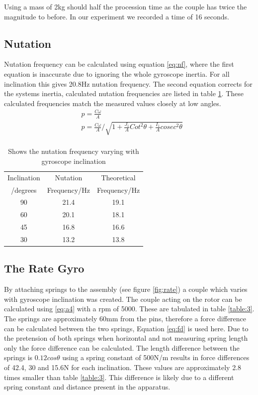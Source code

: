 \documentclass[twoside,twocolumn]{article}
\begin{document}
Using a mass of 2kg should half the procession time as the couple has twice the magnitude to before. In our experiment we recorded a time of 16 seconds.

\subsection{Nutation}
Nutation frequency can be calculated using equation \ref{eq:nf}, where the first equation is inaccurate due to ignoring the whole gyroscope inertia. For all inclination this gives 20.8Hz nutation frequency. The second equation corrects for the systems inertia, calculated nutation frequencies are   listed in table \ref{table:2}. These calculated frequencies match the measured values closely at low angles.
\begin{equation}
\label{eq:nf}
\begin{split}
&p=\frac{C\omega}{A} \\
&p=\frac{C\omega}{A}/\sqrt{1+\frac{J_1}{A}Cot^2\theta+\frac{I_1}{A}cosec^2\theta}\\
\end{split}
\end{equation} 

\begin{table}[h]
\caption{Shows the nutation frequency varying with gyroscope inclination}
\centering
\begin{tabular}{ c | c | c }
Inclination & Nutation & Theoretical \\
/degrees & Frequency/Hz &Frequency/Hz \\
\midrule
90 & 21.4 & 19.1  \\
60 & 20.1 & 18.1 \\
45 & 16.8 &16.6 \\
30 & 13.2 &13.8 \\
\end{tabular}
\label{table:2}
\end{table}


\subsection{The Rate Gyro}
By attaching springs to the assembly (see figure \ref{fig:rate}) a couple which varies with gyroscope inclination was created. The couple acting on the rotor can be calculated using \ref{eq:a4} with a rpm of 5000. These are tabulated in table \ref{table:3}. The springs are approximately 60mm from the pins, therefore a force difference can be calculated between the two springs, Equation \ref{eq:fd} is used here. Due to the pretension of both springs when horizontal and not measuring spring length only the force difference can be calculated. The length difference between the springs is $0.12cos\theta$ using a spring constant of 500N/m results in force differences of 42.4, 30 and 15.6N for each inclination. These values are approximately 2.8 times smaller than table \ref{table:3}. This difference is likely due to a different spring constant and distance present in the apparatus.
\end{document}
